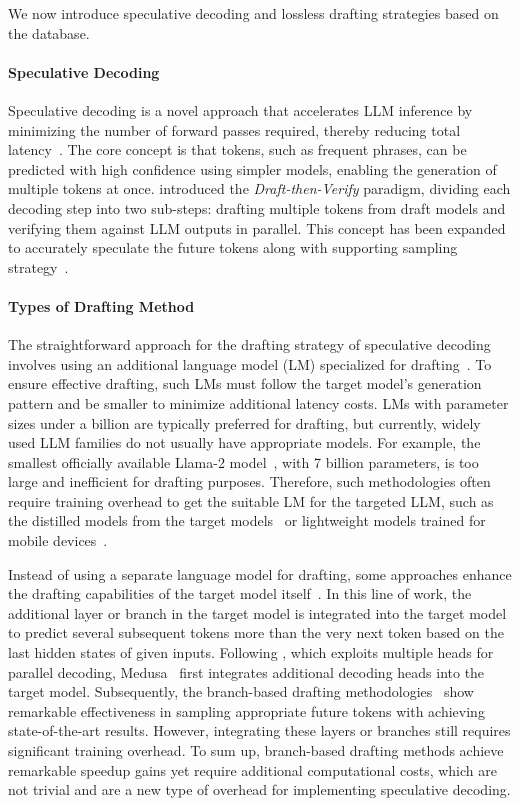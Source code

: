 We now introduce speculative decoding and lossless drafting strategies based on the database.

\paragraph{Speculative Decoding} 
Speculative decoding is a novel approach that accelerates LLM inference by minimizing the number of forward passes required, thereby reducing total latency~\cite{BlockWise, SpecDecoding, SpecSampling}. The core concept is that tokens, such as frequent phrases, can be predicted with high confidence using simpler models, enabling the generation of multiple tokens at once. \citet{BlockWise} introduced the \textit{Draft-then-Verify} paradigm, dividing each decoding step into two sub-steps: drafting multiple tokens from draft models and verifying them against LLM outputs in parallel. This concept has been expanded to accurately speculate the future tokens along with supporting sampling strategy~\cite{seq2seq, SpecDecoding, SpecSampling}. 

\paragraph{Types of Drafting Method}
The straightforward approach for the drafting strategy of speculative decoding involves using an additional language model (LM) specialized for drafting~\cite{SpecDecoding, SpecSampling, SpecInfer, DistilSpec}. 
To ensure effective drafting, such LMs must follow the target model's generation pattern and be smaller to minimize additional latency costs.
LMs with parameter sizes under a billion are typically preferred for drafting, but currently, widely used LLM families do not usually have appropriate models. 
For example, the smallest officially available Llama-2 model~\cite{Llama2}, with 7 billion parameters, is too large and inefficient for drafting purposes.
Therefore, such methodologies often require training overhead to get the suitable LM for the targeted LLM, such as the distilled models from the target models~\cite{SpecInfer} or lightweight models trained for mobile devices~\cite{TinyLlama}.

Instead of using a separate language model for drafting, some approaches enhance the drafting capabilities of the target model itself~\cite{MEDUSA, EAGLE2, EAGLE, Hydra}. 
In this line of work, the additional layer or branch in the target model is integrated into the target model to predict several subsequent tokens more than the very next token based on the last hidden states of given inputs.
Following \citet{BlockWise}, which exploits multiple heads for parallel decoding, Medusa~\cite{MEDUSA} first integrates additional decoding heads into the target model.
Subsequently, the branch-based drafting methodologies~\cite{EAGLE2, EAGLE, Hydra} show remarkable effectiveness in sampling appropriate future tokens with achieving state-of-the-art results.
However, integrating these layers or branches still requires significant training overhead. 
To sum up, branch-based drafting methods achieve remarkable speedup gains yet require additional computational costs, which are not trivial and are a new type of overhead for implementing speculative decoding.

